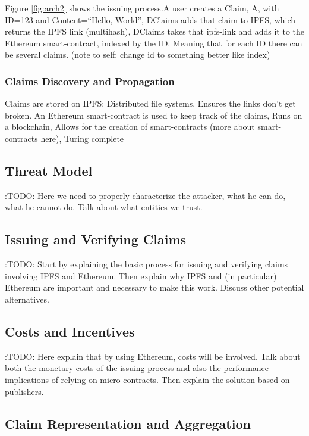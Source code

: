 Figure \ref{fig:arch2} shows the issuing process.A user creates a Claim, A, with ID=123 and Content=“Hello, World”, DClaims adds that claim to IPFS, which returns the IPFS link (multihash), DClaims takes that ipfs-link and adds it to the Ethereum smart-contract, indexed by the ID. Meaning that for each ID there can be several claims. (note to self: change id to something better like index)

\subsubsection{Claims Discovery and Propagation}

Claims are stored on IPFS: Distributed file systems, Ensures the links don’t get broken.
An Ethereum smart-contract is used to keep track of the claims, Runs on a blockchain, Allows for the creation of smart-contracts (more about smart-contracts here), Turing complete

\subsection{Threat Model}

\note:{TODO: Here we need to properly characterize the attacker, what he can do, what he cannot do. Talk about what entities we trust.}

\subsection{Issuing and Verifying Claims}

\note:{TODO: Start by explaining the basic process for issuing and verifying claims involving IPFS and Ethereum. Then explain why IPFS and (in particular) Ethereum are important and necessary to make this work. Discuss other potential alternatives.}

\subsection{Costs and Incentives}

\note:{TODO: Here explain that by using Ethereum, costs will be involved. Talk about both the monetary costs of the issuing process and also the performance implications of relying on micro contracts. Then explain the solution based on publishers.}


\subsection{Claim Representation and Aggregation}

